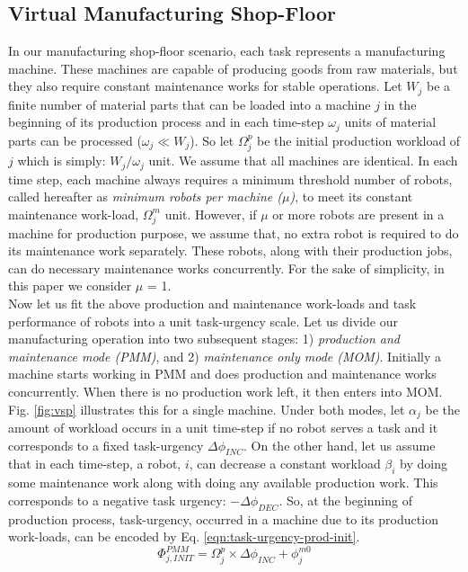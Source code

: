 \documentclass{llncs}
\begin{document}
\subsection{Virtual Manufacturing Shop-Floor}
In our manufacturing shop-floor scenario, each task represents a manufacturing machine. These machines are capable of producing goods from raw materials, but they also require constant maintenance works for stable operations. Let $W_{j}$ be a finite number of material parts that can be loaded into a machine $j$ in the beginning of its production process and in each time-step $\omega_{j}$ units of material parts can be processed  ($\omega_{j} \ll W_{j} $). So let $\Omega_{j}^{p}$ be the initial production workload of $j$ which is simply: $W_{j} / \omega_{j}$ unit. We assume that all machines are identical. In each time step, each machine always requires a minimum threshold number of robots, called hereafter as {\em minimum robots per machine ($\mu$)}, to meet its constant maintenance work-load, $\Omega_{j}^{m}$ unit. However, if $\mu$ or more robots are present in a machine for production purpose, we assume that, no extra robot is required to do its maintenance work separately. These robots, along with their production jobs, can do necessary maintenance works concurrently. For the sake of simplicity, in this paper we consider $\mu$ = 1.\\
Now let us fit the above production and maintenance work-loads and task performance of robots into a unit task-urgency scale. Let us divide our manufacturing operation into two subsequent stages: 1) {\em production and maintenance mode (PMM)}, and 2) {\em maintenance only mode (MOM)}. Initially a machine starts working in PMM and does production and maintenance works concurrently. When there is no production work left, it then enters into MOM. Fig. \ref{fig:vsp} illustrates this for a single machine.
Under both modes, let $\alpha_{j}$ be the amount of workload occurs in a unit time-step if no robot serves a task and it corresponds to a fixed task-urgency $\Delta \phi_{INC}$. On the other hand, let us assume that in each time-step, a robot, $i$, can decrease a constant workload $\beta_{i}$ by doing some maintenance work along with doing any available production work. This  corresponds to a negative task urgency: $- \Delta \phi_{DEC}$. 
So, at the beginning of production process, task-urgency, occurred in a machine due to its production work-loads, can be encoded by Eq. \ref{eqn:task-urgency-prod-init}.
\begin{equation}
\Phi_{j, INIT}^{PMM} = \Omega_{j}^{p} \times \Delta \phi_{INC} + \phi_{j}^{m0}
\label{eqn:task-urgency-prod-init}
\end{equation}
\end{document}
